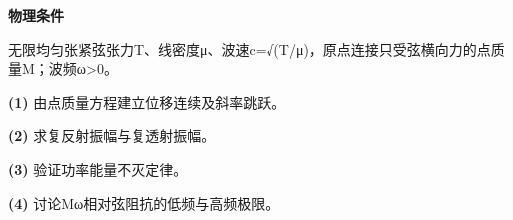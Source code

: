 \textbf{物理条件}\par 无限均匀张紧弦张力T、线密度μ、波速c=√(T/μ)，原点连接只受弦横向力的点质量M；波频ω>0。
\par\noindent\textbf{(1)} 由点质量方程建立位移连续及斜率跳跃。
\par\noindent\textbf{(2)} 求复反射振幅与复透射振幅。
\par\noindent\textbf{(3)} 验证功率能量不灭定律。
\par\noindent\textbf{(4)} 讨论Mω相对弦阻抗的低频与高频极限。
